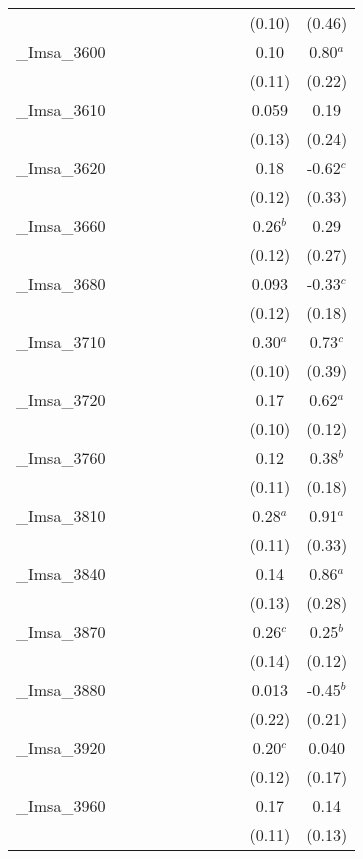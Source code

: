 \documentclass[]{article}
\begin{document}
\begin{tabular}{lcccccccccc}
 &  &  &  &  &  &  &  &  & (0.10) & (0.46) \\
\_Imsa\_3600 &  &  &  &  &  &  &  &  & 0.10 & 0.80$^a$ \\
 &  &  &  &  &  &  &  &  & (0.11) & (0.22) \\
\_Imsa\_3610 &  &  &  &  &  &  &  &  & 0.059 & 0.19 \\
 &  &  &  &  &  &  &  &  & (0.13) & (0.24) \\
\_Imsa\_3620 &  &  &  &  &  &  &  &  & 0.18 & -0.62$^c$ \\
 &  &  &  &  &  &  &  &  & (0.12) & (0.33) \\
\_Imsa\_3660 &  &  &  &  &  &  &  &  & 0.26$^b$ & 0.29 \\
 &  &  &  &  &  &  &  &  & (0.12) & (0.27) \\
\_Imsa\_3680 &  &  &  &  &  &  &  &  & 0.093 & -0.33$^c$ \\
 &  &  &  &  &  &  &  &  & (0.12) & (0.18) \\
\_Imsa\_3710 &  &  &  &  &  &  &  &  & 0.30$^a$ & 0.73$^c$ \\
 &  &  &  &  &  &  &  &  & (0.10) & (0.39) \\
\_Imsa\_3720 &  &  &  &  &  &  &  &  & 0.17 & 0.62$^a$ \\
 &  &  &  &  &  &  &  &  & (0.10) & (0.12) \\
\_Imsa\_3760 &  &  &  &  &  &  &  &  & 0.12 & 0.38$^b$ \\
 &  &  &  &  &  &  &  &  & (0.11) & (0.18) \\
\_Imsa\_3810 &  &  &  &  &  &  &  &  & 0.28$^a$ & 0.91$^a$ \\
 &  &  &  &  &  &  &  &  & (0.11) & (0.33) \\
\_Imsa\_3840 &  &  &  &  &  &  &  &  & 0.14 & 0.86$^a$ \\
 &  &  &  &  &  &  &  &  & (0.13) & (0.28) \\
\_Imsa\_3870 &  &  &  &  &  &  &  &  & 0.26$^c$ & 0.25$^b$ \\
 &  &  &  &  &  &  &  &  & (0.14) & (0.12) \\
\_Imsa\_3880 &  &  &  &  &  &  &  &  & 0.013 & -0.45$^b$ \\
 &  &  &  &  &  &  &  &  & (0.22) & (0.21) \\
\_Imsa\_3920 &  &  &  &  &  &  &  &  & 0.20$^c$ & 0.040 \\
 &  &  &  &  &  &  &  &  & (0.12) & (0.17) \\
\_Imsa\_3960 &  &  &  &  &  &  &  &  & 0.17 & 0.14 \\
 &  &  &  &  &  &  &  &  & (0.11) & (0.13) \\

\end{tabular}
\end{document}
